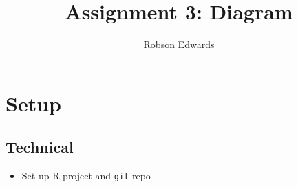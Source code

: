 \documentclass[12pt]{amsart}
\title{Assignment 3: Diagram}
\author{Robson Edwards}
\begin{document}
\maketitle

\section{Setup}
\subsection{Technical}
\begin{itemize}
	\item Set up R project and \lstinline{git} repo
\end{itemize}
\end{document}
